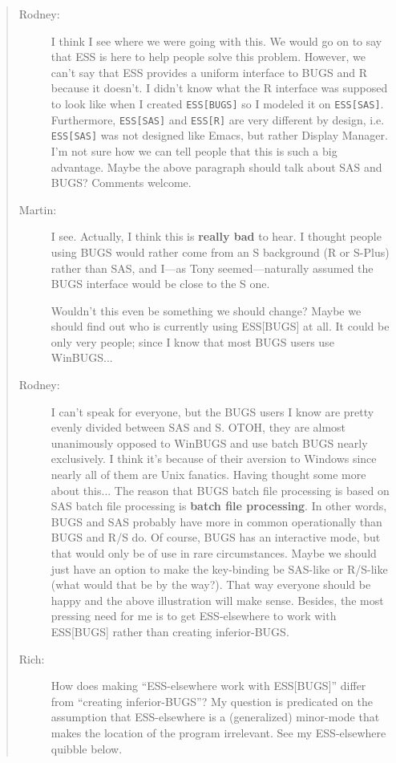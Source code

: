 \documentclass{article}
\newcommand{\stexttt}[1]{{\small\texttt{#1}}}
\newenvironment{Comment}{\begin{quote}\small\itshape }{\end{quote}}
\begin{document}
\begin{Comment}
\begin{description}
 \item[Rodney:]  I think I see where we were going with this.  We would go on to
say that ESS is here to help people solve this problem.  However,
we can't say that ESS provides a uniform interface to BUGS and R because
it doesn't.  I didn't know what the R interface was supposed to look like
when I created \stexttt{ESS[BUGS]} so I modeled it on \stexttt{ESS[SAS]}.  Furthermore,
\stexttt{ESS[SAS]} and \stexttt{ESS[R]} are very different by design, i.e. \stexttt{ESS[SAS]} was not
designed like Emacs, but rather Display Manager.  I'm not sure how we can tell
people that this is such a big advantage.  Maybe the above paragraph
should talk about SAS and BUGS?  Comments welcome.

\item[Martin:] I see. Actually, I think this is \textbf{really bad} to hear.
  I thought people using BUGS would rather come from an S background
  (R or S-Plus) rather than SAS, and I---as Tony seemed---naturally
  assumed the BUGS interface would be close to the S one.

  Wouldn't this even be something we should change?  Maybe we should find
  out who is currently using ESS[BUGS] at all. It could be only very
  people; since I know that most BUGS users use WinBUGS...

\item[Rodney:]  I can't speak for everyone, but the BUGS users I know are
pretty evenly divided between SAS and S.  OTOH, they are almost 
unanimously opposed to WinBUGS and use batch BUGS nearly exclusively.
I think it's because of their aversion to Windows since nearly all of
them are Unix fanatics.  
Having thought some more about this...  The reason that BUGS batch file
processing is based on SAS batch file processing is \textbf{batch file processing}.
In other words, BUGS and SAS probably have more in common operationally
than BUGS and R/S do.  Of course, BUGS has an interactive mode, but that
would only be of use in rare circumstances.  Maybe we should just have an 
option to make the key-binding be SAS-like or R/S-like (what would that be 
by the way?).  That way everyone should be happy and the above illustration
will make sense.  Besides, the most pressing need for me is to get 
ESS-elsewhere to work with ESS[BUGS] rather than creating inferior-BUGS.

\item[Rich:] How does making ``ESS-elsewhere work with ESS[BUGS]'' differ
from ``creating inferior-BUGS''?  My question is predicated on the assumption
that ESS-elsewhere is a (generalized) minor-mode that makes the location
of the program irrelevant.
See my ESS-elsewhere quibble below.


\end{description}
\end{Comment}
\end{document}
